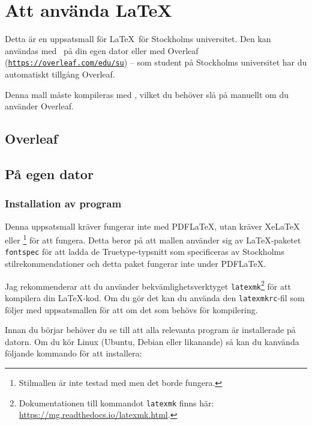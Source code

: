 
\section{Att använda \LaTeX}
\label{latex}

Detta är en uppsatsmall för \LaTeX\ för Stockholms universitet. Den kan
användas med \XeLaTeX\ på din egen dator eller med Overleaf
(\texttt{\href{https://overleaf.com/edu/su}{https://\linebreak[0]{}overleaf\linebreak[0]{}.com/\linebreak[0]{}edu/\linebreak[0]{}su}})
-- som student på Stockholms universitet har du automatiskt tillgång Overleaf.

Denna mall måste kompileras med \XeLaTeX, vilket du behöver slå på manuellt om
du använder Overleaf.

\subsection{Overleaf}


\subsection{På egen dator}

\subsubsection{Installation av program}

Denna uppsatsmall kräver fungerar inte med PDF\LaTeX, utan kräver XeLaTeX eller
\LuaLaTeX\footnote{Stilmallen är inte testad med \LuaLaTeX{} men det borde
  fungera.} för att fungera. Detta beror på att mallen använder sig av
\LaTeX-paketet \texttt{fontspec} för att ladda de Truetype-typsnitt som
specificeras av Stockholms stilrekommendationer och detta paket fungerar inte
under PDF\LaTeX.

Jag rekommenderar att du använder bekvämlighetsverktyget
\texttt{latexmk}\footnote{Dokumentationen till kommandot \texttt{latexmk} finns
  här: \url{https://mg.readthedocs.io/latexmk.html}. } för att kompilera din
\LaTeX-kod. Om du gör det kan du använda den \texttt{latexmkrc}-fil som följer
med uppsatsmallen för att om det som behövs för kompilering.

Innan du börjar behöver du se till att alla relevanta program är installerade
på datorn. Om du kör Linux (Ubuntu, Debian eller likanande) så kan du kanvända
följande kommando för att installera:

